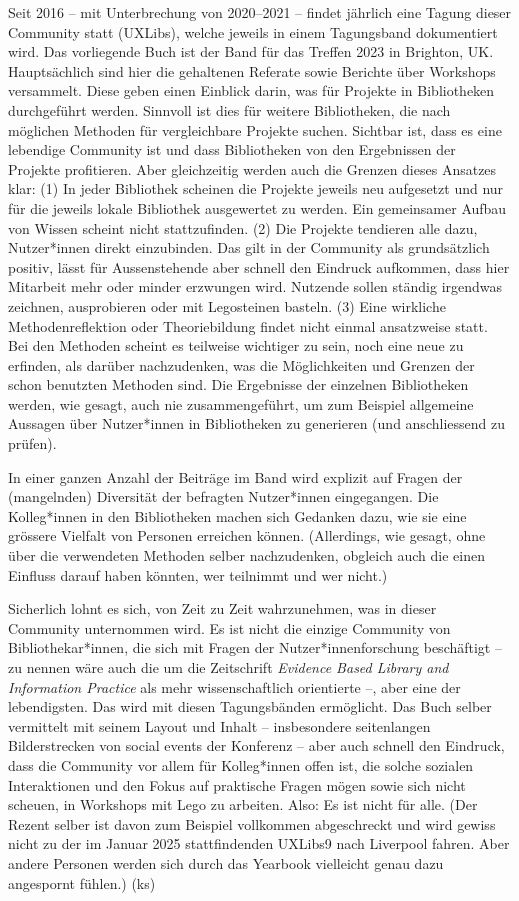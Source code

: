\documentclass[a4paper,
fontsize=11pt,
oneside,
numbers=noperiodatend,
parskip=half-,
bibliography=totoc,
final
]{scrartcl}
\begin{document}
Seit 2016 – mit Unterbrechung von 2020–2021 – findet jährlich eine
Tagung dieser Community statt (UXLibs), welche jeweils in einem
Tagungsband dokumentiert wird. Das vorliegende Buch ist der Band für das
Treffen 2023 in Brighton, UK. Hauptsächlich sind hier die gehaltenen
Referate sowie Berichte über Workshops versammelt. Diese geben einen
Einblick darin, was für Projekte in Bibliotheken durchgeführt werden.
Sinnvoll ist dies für weitere Bibliotheken, die nach möglichen Methoden
für vergleichbare Projekte suchen. Sichtbar ist, dass es eine lebendige
Community ist und dass Bibliotheken von den Ergebnissen der Projekte
profitieren. Aber gleichzeitig werden auch die Grenzen dieses Ansatzes
klar: (1) In jeder Bibliothek scheinen die Projekte jeweils neu
aufgesetzt und nur für die jeweils lokale Bibliothek ausgewertet zu
werden. Ein gemeinsamer Aufbau von Wissen scheint nicht stattzufinden.
(2) Die Projekte tendieren alle dazu, Nutzer*innen direkt einzubinden.
Das gilt in der Community als grundsätzlich positiv, lässt für
Aussenstehende aber schnell den Eindruck aufkommen, dass hier Mitarbeit
mehr oder minder erzwungen wird. Nutzende sollen ständig irgendwas
zeichnen, ausprobieren oder mit Legosteinen basteln. (3) Eine wirkliche
Methodenreflektion oder Theoriebildung findet nicht einmal ansatzweise
statt. Bei den Methoden scheint es teilweise wichtiger zu sein, noch
eine neue zu erfinden, als darüber nachzudenken, was die Möglichkeiten
und Grenzen der schon benutzten Methoden sind. Die Ergebnisse der
einzelnen Bibliotheken werden, wie gesagt, auch nie zusammengeführt, um
zum Beispiel allgemeine Aussagen über Nutzer*innen in Bibliotheken zu
generieren (und anschliessend zu prüfen).

In einer ganzen Anzahl der Beiträge im Band wird explizit auf Fragen der
(mangelnden) Diversität der befragten Nutzer*innen eingegangen. Die
Kolleg*innen in den Bibliotheken machen sich Gedanken dazu, wie sie eine
grössere Vielfalt von Personen erreichen können. (Allerdings, wie
gesagt, ohne über die verwendeten Methoden selber nachzudenken, obgleich
auch die einen Einfluss darauf haben könnten, wer teilnimmt und wer
nicht.)

Sicherlich lohnt es sich, von Zeit zu Zeit wahrzunehmen, was in dieser
Community unternommen wird. Es ist nicht die einzige Community von
Bibliothekar*innen, die sich mit Fragen der Nutzer*innenforschung
beschäftigt – zu nennen wäre auch die um die Zeitschrift \emph{Evidence
Based Library and Information Practice} als mehr wissenschaftlich
orientierte –, aber eine der lebendigsten. Das wird mit diesen
Tagungsbänden ermöglicht. Das Buch selber vermittelt mit seinem Layout
und Inhalt – insbesondere seitenlangen Bilderstrecken von social events
der Konferenz – aber auch schnell den Eindruck, dass die Community vor
allem für Kolleg*innen offen ist, die solche sozialen Interaktionen und
den Fokus auf praktische Fragen mögen sowie sich nicht scheuen, in
Workshops mit Lego zu arbeiten. Also: Es ist nicht für alle. (Der Rezent
selber ist davon zum Beispiel vollkommen abgeschreckt und wird gewiss
nicht zu der im Januar 2025 stattfindenden UXLibs9 nach Liverpool
fahren. Aber andere Personen werden sich durch das Yearbook vielleicht
genau dazu angespornt fühlen.) (ks)
\end{document}
